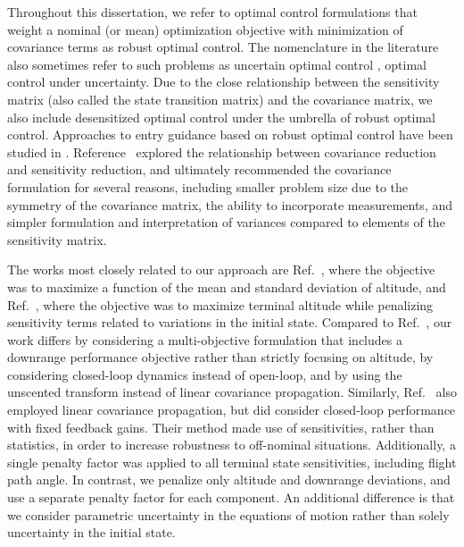 
Throughout this dissertation, we refer to optimal control formulations that weight a nominal (or mean) optimization objective with minimization of covariance terms as robust optimal control. The nomenclature in the literature also sometimes refer to such problems as uncertain optimal control \cite{PhelpsUncertainOCP}, optimal control under uncertainty. Due to the close relationship between the sensitivity matrix (also called the state transition matrix) and the covariance matrix, we also include desensitized optimal control \cite{Desensitized,TrajectoryDesensitization} under the umbrella of robust optimal control. 
Approaches to entry guidance based on robust optimal control have been studied in \cite{AltitudeUnderUncertainty, EntryOUUThesis1, EntryOUUThesis2, MarsEntryDesensitized, EntryOUU}. Reference~\cite{EntryOUUThesis1} explored the relationship between covariance reduction and sensitivity reduction, and ultimately recommended the covariance formulation for several reasons, including smaller problem size due to the symmetry of the covariance matrix, the ability to incorporate measurements, and simpler formulation and interpretation of variances compared to elements of the sensitivity matrix.

The works most closely related to our approach are Ref.~\cite{AltitudeUnderUncertainty}, where the objective was to maximize a function of the mean and standard deviation of altitude, and Ref.~\cite{MarsEntryDesensitized}, where the objective was to maximize terminal altitude while penalizing sensitivity terms related to variations in the initial state. Compared to Ref.~\cite{AltitudeUnderUncertainty}, our work differs by considering a multi-objective formulation that includes a downrange performance objective rather than strictly focusing on altitude, by considering closed-loop dynamics instead of open-loop, and by using the unscented transform instead of linear covariance propagation. Similarly, Ref.~\cite{MarsEntryDesensitized} also employed linear covariance propagation, but did consider closed-loop performance with fixed feedback gains. Their method made use of sensitivities, rather than statistics, in order to increase robustness to off-nominal situations. Additionally, a single penalty factor was applied to all terminal state sensitivities, including flight path angle. In contrast, we penalize only altitude and downrange deviations, and use a separate penalty factor for each component. An additional difference is that we consider parametric uncertainty in the equations of motion rather than solely uncertainty in the initial state. 

